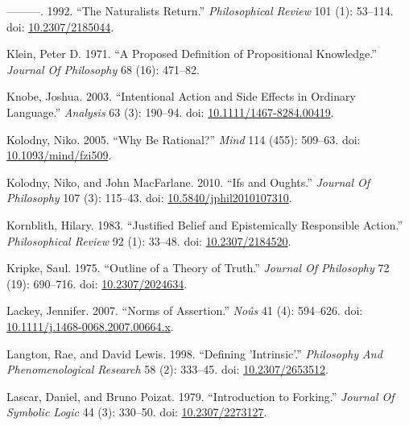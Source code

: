 \documentclass[
  10pt,
  letterpaper,
  DIV=11,
  numbers=noendperiod,
  twoside]{scrartcl}
\newlength{\cslhangindent}
\newenvironment{CSLReferences}[2] %
 {\begin{list}{}{%
  \setlength{\itemindent}{0pt}
  \setlength{\leftmargin}{0pt}
  \setlength{\parsep}{0pt}
  \ifodd #1
   \setlength{\leftmargin}{\cslhangindent}
   \setlength{\itemindent}{-1\cslhangindent}
  \fi
  \setlength{\itemsep}{#2\baselineskip}}}
 {\end{list}}
\begin{document}
\begin{CSLReferences}{1}{0}
---------. 1992. {``The Naturalists Return.''} \emph{Philosophical
Review} 101 (1): 53--114. doi:
\href{https://doi.org/10.2307/2185044}{10.2307/2185044}.

Klein, Peter D. 1971. {``A Proposed Definition of Propositional
Knowledge.''} \emph{Journal Of Philosophy} 68 (16): 471--82.

Knobe, Joshua. 2003. {``Intentional Action and Side Effects in Ordinary
Language.''} \emph{Analysis} 63 (3): 190--94. doi:
\href{https://doi.org/10.1111/1467-8284.00419}{10.1111/1467-8284.00419}.

Kolodny, Niko. 2005. {``Why Be Rational?''} \emph{Mind} 114 (455):
509--63. doi:
\href{https://doi.org/10.1093/mind/fzi509}{10.1093/mind/fzi509}.

Kolodny, Niko, and John MacFarlane. 2010. {``Ifs and Oughts.''}
\emph{Journal Of Philosophy} 107 (3): 115--43. doi:
\href{https://doi.org/10.5840/jphil2010107310}{10.5840/jphil2010107310}.

Kornblith, Hilary. 1983. {``Justified Belief and Epistemically
Responsible Action.''} \emph{Philosophical Review} 92 (1): 33--48. doi:
\href{https://doi.org/10.2307/2184520}{10.2307/2184520}.

Kripke, Saul. 1975. {``Outline of a Theory of Truth.''} \emph{Journal Of
Philosophy} 72 (19): 690--716. doi:
\href{https://doi.org/10.2307/2024634}{10.2307/2024634}.

Lackey, Jennifer. 2007. {``Norms of Assertion.''} \emph{Noûs} 41 (4):
594--626. doi:
\href{https://doi.org/10.1111/j.1468-0068.2007.00664.x}{10.1111/j.1468-0068.2007.00664.x}.

Langton, Rae, and David Lewis. 1998. {``Defining 'Intrinsic'.''}
\emph{Philosophy And Phenomenological Research} 58 (2): 333--45. doi:
\href{https://doi.org/10.2307/2653512}{10.2307/2653512}.

Lascar, Daniel, and Bruno Poizat. 1979. {``Introduction to Forking.''}
\emph{Journal Of Symbolic Logic} 44 (3): 330--50. doi:
\href{https://doi.org/10.2307/2273127}{10.2307/2273127}.


\end{CSLReferences}
\end{document}
